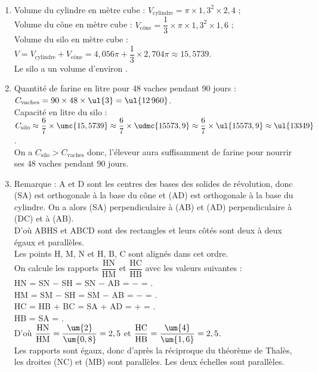 \begin{corrige}
\ \\ [-5mm]
   \begin{enumerate}
      \item Volume du cylindre en mètre cube : $V_{\text{cylindre}} = \pi\times1,3^2\times2,4$ ; \\ [1mm]
         Volume du cône en mètre cube : $V_{\text{cône}} = \dfrac13\times\pi\times1,3^2\times1,6$ ; \\
         Volume du silo en mètre cube : $V =V_{\text{cylindre}}+V_{\text{cône}} =4,056\pi+\dfrac13\times2,704\pi \approx 15,5739$. \\
         {\blue Le silo a un volume d'environ }.
      \item Quantité de farine en litre pour 48 vaches pendant 90 jours : $C_{\text{vaches}} =90\times48\times\ul{3} =\ul{12\,960}$. \\
         Capacité en litre du silo : $C_{\text{silo}} \approx\dfrac67\times\umc{15,5739} \approx\dfrac67\times\udmc{15573,9} \approx\dfrac67\times\ul{15573,9} \approx \ul{13349}$. \\
         On a $C_{\text{silo}}>C_{\text{vaches}}$ donc, {\blue l'éleveur aura suffisamment de farine pour nourrir ses 48 vaches pendant 90 jours}.
      \item Remarque : A et D  sont les centres des bases des solides de révolution, donc (SA) est orthogonale à la base du cône et (AD) est orthogonale à la base du cylindre. On a alors (SA) perpendiculaire à (AB) et (AD) perpendiculaire à (DC) et à (AB). \\
         D'où ABHS et ABCD sont des rectangles et leurs côtés sont deux à deux égaux et parallèles. \\
         Les points H, M, N et H, B, C sont alignés dans cet ordre. \\ [1mm]
         On calcule les rapports $\dfrac{\text{HN}}{\text{HM}}$ et $\dfrac{\text{HC}}{\text{HB}}$ avec les valeurs suivantes : \\ [1mm]
         HN = SN $-$ SH = SN $-$ AB =  $-$  = . \\
         HM = SM $-$ SH = SM $-$ AB =  $-$  = . \\
         HC = HB + BC = SA + AD =  +  = . \\
         HB = SA = . \\ [1mm]
         D'où $\dfrac{\text{HN}}{\text{HM}} =\dfrac{\um{2}}{\um{0,8}} =2,5$ et $\dfrac{\text{HC}}{\text{HB}} =\dfrac{\um{4}}{\um{1,6}} =2,5$. \\ [1mm]
         Les rapports sont égaux, donc d'après la réciproque du théorème de Thalès, les droites (NC) et (MB) sont parallèles. {\blue Les deux échelles sont parallèles}.
   \end{enumerate}
\end{corrige}

